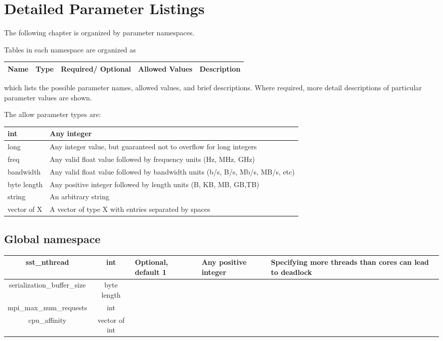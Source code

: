 
\newcommand{\openTable}{\begin{tabular}{| c | c | p{2cm} | p{2cm} | p{6.5cm} |}}

\chapter{Detailed Parameter Listings}
\label{chapter:parameters}
The following chapter is organized by parameter namespaces.

Tables in each namespace are organized as
\def\arraystretch{1.5}%

\openTable
\hline
Name & Type & Required/ Optional & Allowed \newline Values & Description \\
\hline
\end{tabular}

which lists the possible parameter names, allowed values, and brief descriptions.
Where required, more detail descriptions of particular parameter values are shown.

The allow parameter types are:

\begin{tabular}{l | l}
\hline
int & Any integer \\
\hline
long & Any integer value, but guaranteed not to overflow for long integers \\
\hline
freq & Any valid float value followed by frequency units (Hz, MHz, GHz) \\
\hline
bandwidth & Any valid float value followed by bandwidth units (b/s, B/s, Mb/s, MB/s, etc) \\
\hline
byte length & Any positive integer followed by length units (B, KB, MB, GB,TB) \\
\hline
string & An arbitrary string \\
\hline
vector of X & A vector of type X with entries separated by spaces \\
\hline
\end{tabular}
\section{Global namespace}
\openTable
\hline
sst\_nthread & int & Optional, default 1 & Any positive integer & Specifying more threads than cores can lead to deadlock \\
\hline
serialization\_buffer\_size & byte length \\
\hline
mpi\_max\_num\_requests & int \\
\hline
cpu\_affinity & vector of int \\
\hline
\end{tabular}

